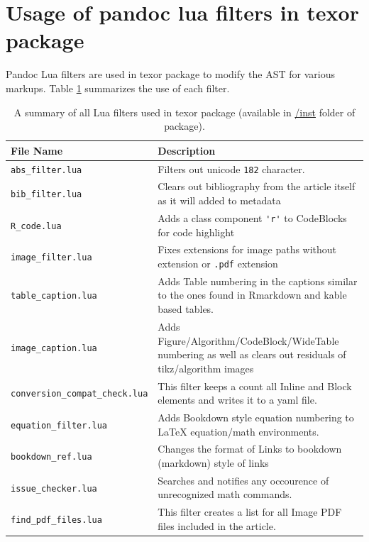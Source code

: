 \section{Usage of pandoc lua filters in texor package}
Pandoc Lua filters are used in texor package to modify the AST for various markups.
 Table \ref{tab:filters} summarizes the use of each filter.
\begin{table}
\begin{tabular}{|l|p{10cm}|}
\hline
File Name & Description\\
\hline
\verb|abs_filter.lua| & {Filters out unicode \verb|182| character.}\\
\hline
\verb|bib_filter.lua| & Clears out bibliography from the article itself as it will added to metadata\\
\hline
\verb|R_code.lua| & Adds a class component \verb|'r'| to CodeBlocks for code highlight \\
\hline
\verb|image_filter.lua| & Fixes extensions for image paths without extension or \verb|.pdf| extension \\
\hline
\verb|table_caption.lua| & Adds Table numbering in the captions similar to the ones found in Rmarkdown and kable based tables. \\
\hline
\verb|image_caption.lua| & Adds Figure/Algorithm/CodeBlock/WideTable numbering as well as clears out residuals of tikz/algorithm images \\
\hline
\verb|conversion_compat_check.lua| & This filter keeps a count all Inline and Block elements and writes it to a yaml file. \\
\hline
\verb|equation_filter.lua| & Adds Bookdown style equation numbering to LaTeX equation/math environments.\\
\hline
\verb|bookdown_ref.lua| & Changes the format of Links to bookdown (markdown) style of links\\
\hline
\verb|issue_checker.lua| & Searches and notifies any occourence of unrecognized math commands.\\
\hline
\verb|find_pdf_files.lua| & This filter creates a list for all Image PDF files included in the article.\\
\hline
\end{tabular}
\caption{A summary of all Lua filters used in texor package (available in \href{https://github.com/Abhi-1U/texor/tree/master/inst}{/inst} folder of package).}
\label{tab:filters}
\end{table}



